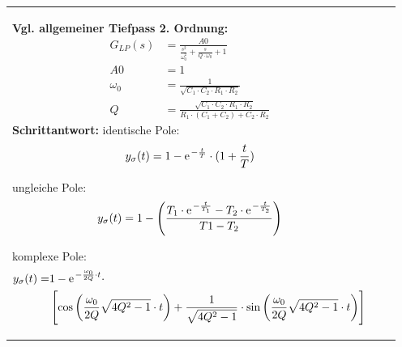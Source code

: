 \begin{longtable}{|>{\bfseries}p{3cm}|c|p{10cm}|}
{       \textbf{Vgl. allgemeiner Tiefpass 2. Ordnung:}\newline
       \begin{align*}
           G_{LP}(s)	&= \frac{A0}{\frac{s^2}{\omega_{0}^2}+\frac{s}{Q\cdot\omega_{0}}+1} \\
           A0	 		&= 1 \\
           \omega_{0}	&= \frac{1}{\sqrt{C_1\cdot C_2\cdot R_1\cdot R_2}}\\
           Q 	        &=\frac{\sqrt{C_1\cdot C_2\cdot R_1\cdot R_2}}{R_1\cdot (C_1+C_2)+C_2 \cdot R_2}
        \end{align*}\newline
        \textbf{Schrittantwort:} \newline
        identische Pole: \newline
        \[y_{\sigma}(t) = 1-\e^{-\frac{t}{T}}\cdot(1+\frac{t}{T})\] \newline
          
        ungleiche Pole: \newline
        \[y_{\sigma}(t) = 1-\left(\frac{T_1 \cdot \e^{-\frac{t}{T_1}}- T_2 \cdot
        \e^{-\frac{t}{T_2}}}{T1-T_2}\right) \] \newline
          
        komplexe Pole: \newline
        \begin{align*}
          y_{\sigma}(t) = &1-\e^{-\frac{\omega_0}{2Q}\cdot t}\cdot \\
          &\left[\cos \left(\frac{\omega_0}{2Q} \sqrt{4Q^2-1} \cdot t \right) +
          \frac{1}{\sqrt{4Q^2-1}}\cdot \sin\left(\frac{\omega_0}{2Q} \sqrt{4Q^2-1} \cdot t \right)\right]
        \end{align*} \newline
        
}
\end{longtable}
